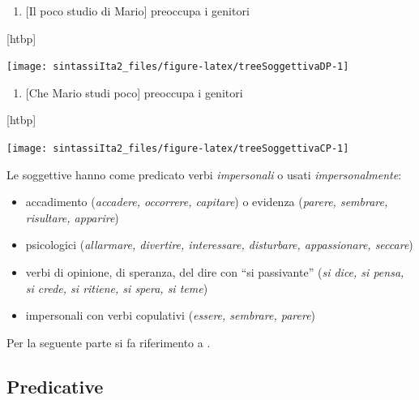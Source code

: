 \documentclass[
  a4paper,
  twoside,
  11pt,
  chapterprefix=false,
  bibliography=totocnumbered,
  listof=flat]{scrbook}
\makeatletter
\providecommand{\tightlist}{%
  \setlength{\itemsep}{0pt}\setlength{\parskip}{0pt}}
\def\fps@figure{htbp}
\renewenvironment{figure}[1][\fps@figure]{
  \edef\@tempa{\noexpand\@float{figure}[#1]} 
  \@tempa
  \sffamily
}{
  \end@float
}
\makeatother
\begin{document}
\begin{enumerate}
\def\labelenumi{(\arabic{enumi})}
\setcounter{enumi}{28}
\tightlist
\item
  {[}Il poco studio di Mario{]} preoccupa i genitori
\end{enumerate}

\begin{figure}

{\centering \texttt{[image: sintassiIta2\_files/figure-latex/treeSoggettivaDP-1]} 

}

\caption{Frase con DP nello spazio soggetto}\label{fig:treeSoggettivaDP}
\end{figure}

\begin{enumerate}
\def\labelenumi{(\arabic{enumi})}
\setcounter{enumi}{29}
\tightlist
\item
  {[}Che Mario studi poco{]} preoccupa i genitori
\end{enumerate}

\begin{figure}

{\centering \texttt{[image: sintassiIta2\_files/figure-latex/treeSoggettivaCP-1]} 

}

\caption{Frase con CP nello spazio soggetto}\label{fig:treeSoggettivaCP}
\end{figure}

Le soggettive hanno come predicato verbi \emph{impersonali} o usati \emph{impersonalmente}:

\begin{itemize}
\tightlist
\item
  accadimento (\emph{accadere, occorrere, capitare}) o evidenza (\emph{parere, sembrare, risultare, apparire})
\item
  psicologici (\emph{allarmare, divertire, interessare, disturbare, appassionare, seccare})
\item
  verbi di opinione, di speranza, del dire con \enquote{si passivante} (\emph{si dice, si pensa, si crede, si ritiene, si spera, si teme})
\item
  impersonali con verbi copulativi (\emph{essere, sembrare, parere})
\end{itemize}

Per la seguente parte si fa riferimento a \citep[660 e sgg.]{renzi1988}.

\hypertarget{predicative}{%
\subsection{Predicative}\label{predicative}}
\end{document}
